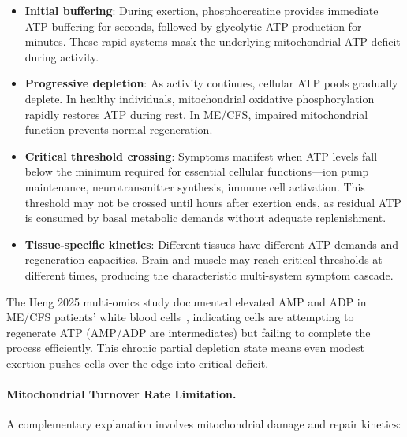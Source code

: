 \begin{itemize}
    \item \textbf{Initial buffering}: During exertion, phosphocreatine provides immediate ATP buffering for seconds, followed by glycolytic ATP production for minutes. These rapid systems mask the underlying mitochondrial ATP deficit during activity.
    \item \textbf{Progressive depletion}: As activity continues, cellular ATP pools gradually deplete. In healthy individuals, mitochondrial oxidative phosphorylation rapidly restores ATP during rest. In ME/CFS, impaired mitochondrial function prevents normal regeneration.
    \item \textbf{Critical threshold crossing}: Symptoms manifest when ATP levels fall below the minimum required for essential cellular functions---ion pump maintenance, neurotransmitter synthesis, immune cell activation. This threshold may not be crossed until hours after exertion ends, as residual ATP is consumed by basal metabolic demands without adequate replenishment.
    \item \textbf{Tissue-specific kinetics}: Different tissues have different ATP demands and regeneration capacities. Brain and muscle may reach critical thresholds at different times, producing the characteristic multi-system symptom cascade.
\end{itemize}

The Heng 2025 multi-omics study documented elevated AMP and ADP in ME/CFS patients' white blood cells~\cite{heng2025mecfs}, indicating cells are attempting to regenerate ATP (AMP/ADP are intermediates) but failing to complete the process efficiently. This chronic partial depletion state means even modest exertion pushes cells over the edge into critical deficit.

\paragraph{Mitochondrial Turnover Rate Limitation.}

A complementary explanation involves mitochondrial damage and repair kinetics:

